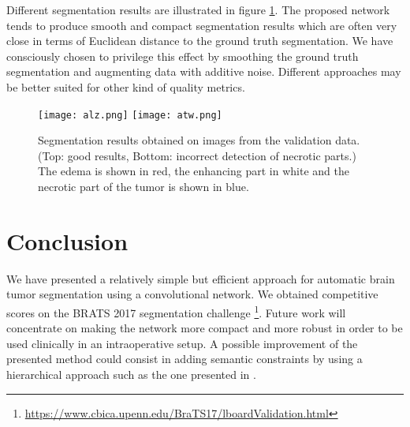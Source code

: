 \documentclass[11pt]{article}
\begin{document}
Different segmentation results are illustrated in figure \ref{test1}. The proposed network tends to produce smooth and compact segmentation results which are often very close in terms of Euclidean distance to the ground truth segmentation. We have consciously chosen to privilege this effect by smoothing the ground truth segmentation and augmenting data with additive noise. Different approaches may be better suited for other kind of quality metrics.\\

\begin{figure}[httb]
    \centering
    \texttt{[image: alz.png]}
    \texttt{[image: atw.png]}
    \caption{Segmentation results obtained on images from the validation data. (Top: good results, Bottom: incorrect detection of necrotic parts.) The edema is shown in red, the enhancing part in white and the necrotic part of the tumor is shown in blue.  }
    \label{test1}
\end{figure}


\section{Conclusion}

We have presented a relatively simple but efficient approach for automatic brain tumor segmentation using a convolutional network. We obtained competitive scores on the BRATS 2017 segmentation challenge \footnote{\url{https://www.cbica.upenn.edu/BraTS17/lboardValidation.html}}. Future work will concentrate on making the network more compact and more robust in order to be used clinically in an intraoperative setup. A possible improvement of the presented method could consist in adding semantic constraints by using a hierarchical approach such as the one presented in \cite{UCL}.\\


\end{document}

